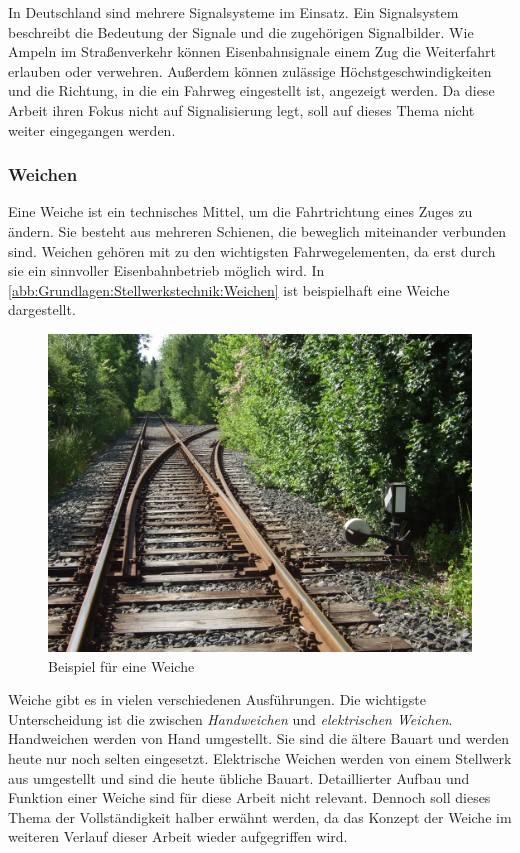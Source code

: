 In Deutschland sind mehrere Signalsysteme im Einsatz. Ein Signalsystem beschreibt die Bedeutung der Signale und die zugehörigen Signalbilder. Wie Ampeln im Straßenverkehr können Eisenbahnsignale einem Zug die Weiterfahrt erlauben oder verwehren. Außerdem können zulässige Höchstgeschwindigkeiten und die Richtung, in die ein Fahrweg eingestellt ist, angezeigt werden. Da diese Arbeit ihren Fokus nicht auf Signalisierung legt, soll auf dieses Thema nicht weiter eingegangen werden.

\subsubsection*{Weichen}\label{text:Grundlagen:Stellwerkstechnik:Sicherung-des-Schienenverkehrs:Weichen}

Eine Weiche ist ein technisches Mittel, um die Fahrtrichtung eines Zuges zu ändern. Sie besteht aus mehreren Schienen, die beweglich miteinander verbunden sind. Weichen gehören mit zu den wichtigsten Fahrwegelementen, da erst durch sie ein sinnvoller Eisenbahnbetrieb möglich wird. In \autoref{abb:Grundlagen:Stellwerkstechnik:Weichen} ist beispielhaft eine Weiche dargestellt.

\begin{figure}[H]
    \centering
    \includegraphics[width=.6\textwidth]{Assets/Images/2-Grundlagen/Handweiche.jpg}
    \caption{Beispiel für eine Weiche}\label{abb:Grundlagen:Stellwerkstechnik:Weichen}
\end{figure}

Weiche gibt es in vielen verschiedenen Ausführungen. Die wichtigste Unterscheidung ist die zwischen \textit{Handweichen} und \textit{elektrischen Weichen}. Handweichen werden von Hand umgestellt. Sie sind die ältere Bauart und werden heute nur noch selten eingesetzt. Elektrische Weichen werden von einem Stellwerk aus umgestellt und sind die heute übliche Bauart. Detaillierter Aufbau und Funktion einer Weiche sind für diese Arbeit nicht relevant. Dennoch soll dieses Thema der Vollständigkeit halber erwähnt werden, da das Konzept der Weiche im weiteren Verlauf dieser Arbeit wieder aufgegriffen wird.

